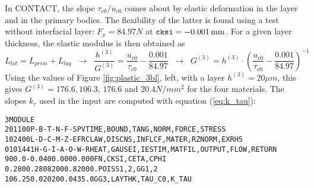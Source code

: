 \documentclass[12pt]{report}
\begin{document}
In CONTACT, the slope $\tau_{c0}/u_{c0}$ comes about by elastic deformation
in the layer and in the primary bodies. The flexibility of the latter is
found using a test without interfacial layer: $F_x=84.97\unit{N}$ at ${\tt
cksi}=-0.001\,\mathrm{mm}$. For a given layer thickness, the elastic modulus is then
obtained as
\begin{equation}
   L_{tot} = L_{prim} + L_{lay}
        \;\;\rightarrow\;\;
   \frac{h^{(3)}}{G^{(3)}} = \frac{u_{c0}}{\tau_{c0}} 
                           - \frac{0.001}{84.97}
        \;\;\rightarrow\;\;
   G^{(3)} = h^{(3)} \cdot \left( \frac{u_{c0}}{\tau_{c0}} 
                           - \frac{0.001}{84.97} \right)^{-1}
\end{equation}
Using the values of Figure \ref{fig:plastic_3bl}, left, with a layer
$h^{(3)}=20\unit{\mu m}$, this gives $G^{(3)}=176.6, 106.3$, $176.6$ and
$20.4\unit{N/mm^2}$ for the four materials. The slopes $k_\tau$ used in the
input are computed with equation (\ref{eq:k_tau}):
\begin{alltt}\small
% Series 2: Clay,  u_c0 = 0.040 mm, tau_c0 = 200 N/mm2, k_u = 400 N/mm2 / mm

 3  MODULE
  201100     P-B-T-N-F-S        PVTIME, BOUND , TANG  , NORM , FORCE, STRESS
  102400     L-D-C-M-Z-E        FRCLAW, DISCNS, INFLCF, MATER, RZNORM, EXRHS
 0101441   H-G-I-A-O-W-R  HEAT, GAUSEI, IESTIM, MATFIL, OUTPUT, FLOW, RETURN
   900.0      -0.040       0.000      0.000      FN, CKSI, CETA, CPHI
   0.280       0.280       82000.     82000.     POISS 1,2, GG 1,2
   106.25      0.020       200.0      435.0      GG3, LAYTHK, TAU_C0, K_TAU
\end{alltt}
\end{document}
